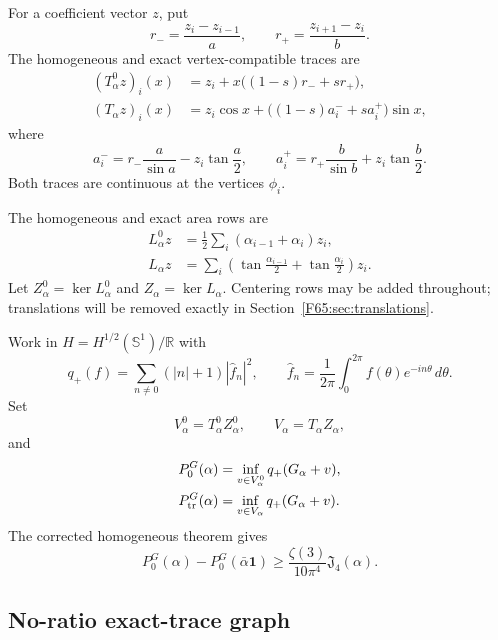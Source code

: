 \documentclass[11pt]{amsart}
\numberwithin{equation}{section}
\theoremstyle{definition}
\theoremstyle{remark}
\newcommand{\Sone}{\mathbb S^1}
\newcommand{\R}{\mathbb R}
\newcommand{\Jfour}{\mathfrak J_4}
\newcommand{\qplus}{q_+}
\begin{document}
For a coefficient vector $z$, put
\begin{equation}
 r_- =\frac{z_i-z_{i-1}}a,
 \qquad r_+=\frac{z_{i+1}-z_i}b.
\end{equation}
The homogeneous and exact vertex-compatible traces are
\begin{align}
 (T_\alpha^0z)_i(x)
 &=z_i+x\bigl((1-s)r_-+sr_+\bigr),\label{F65:eq:T0}\\
 (T_\alpha z)_i(x)
 &=z_i\cos x+\bigl((1-s)a_i^-+sa_i^+\bigr)\sin x,
 \label{F65:eq:T}
\end{align}
where
\begin{equation}\label{F65:eq:apm}
 a_i^-=r_-\frac a{\sin a}-z_i\tan\frac a2,
 \qquad
 a_i^+=r_+\frac b{\sin b}+z_i\tan\frac b2.
\end{equation}
Both traces are continuous at the vertices $\phi_i$.

The homogeneous and exact area rows are
\begin{align}
 L_\alpha^0z
 &=\frac12\sum_i(\alpha_{i-1}+\alpha_i)z_i,\label{F65:eq:L0}\\
 L_\alpha z
 &=\sum_i\left(\tan\frac{\alpha_{i-1}}2
 +\tan\frac{\alpha_i}2\right)z_i.\label{F65:eq:L}
\end{align}
Let $Z_\alpha^0=\ker L_\alpha^0$ and $Z_\alpha=\ker L_\alpha$.
Centering rows may be added throughout; translations will be removed exactly
in Section~\ref{F65:sec:translations}.

Work in $H=H^{1/2}(\Sone)/\R$ with
\begin{equation}\label{F65:eq:qplus}
 \qplus(f)=\sum_{n\ne0}(|n|+1)|\widehat f_n|^2,
 \qquad
 \widehat f_n=\frac1{2\pi}\int_0^{2\pi}f(\theta)e^{-in\theta}\,d\theta.
\end{equation}
Set
\begin{equation}
 V_\alpha^0=T_\alpha^0Z_\alpha^0,
 \qquad V_\alpha=T_\alpha Z_\alpha,
\end{equation}
and
\begin{align}
 P_0^G(\alpha)&=\inf_{v\in V_\alpha^0}\qplus(G_\alpha+v),
 \label{F65:eq:P0}\\
 P_{\rm tr}^G(\alpha)&=\inf_{v\in V_\alpha}\qplus(G_\alpha+v).
 \label{F65:eq:Ptr}
\end{align}
The corrected homogeneous theorem gives
\begin{equation}\label{F65:eq:input-gap}
 P_0^G(\alpha)-P_0^G(\bar\alpha\mathbf1)
 \ge\frac{\zeta(3)}{10\pi^4}\Jfour(\alpha).
\end{equation}

\subsection{No-ratio exact-trace graph}
\end{document}
